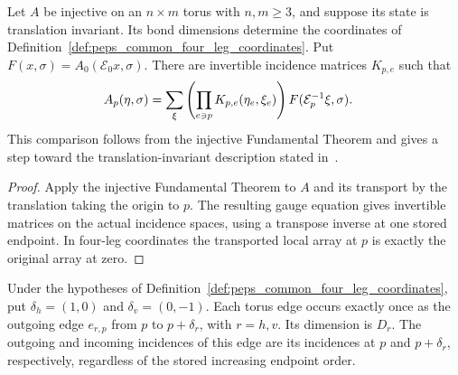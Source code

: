 \begin{lemma}%
    \label{thm:peps_common_local_translation_orbit}
    \leanok
    Let $A$ be injective on an $n\times m$ torus with $n,m\ge3$, and
    suppose its state is translation invariant. Its bond dimensions determine
    the coordinates of Definition~\ref{def:peps_common_four_leg_coordinates}.
    Put $F(x,\sigma)=A_0(\mathcal E_0x,\sigma)$.
    There are invertible incidence matrices $K_{p,e}$ such that
    \begin{align}
        A_p(\eta,\sigma)
         & =\sum_\xi\left(\prod_{e\ni p}K_{p,e}(\eta_e,\xi_e)\right)
        F(\mathcal E_p^{-1}\xi,\sigma).\notag
    \end{align}
    This comparison follows from the injective Fundamental Theorem and
    gives a step toward the translation-invariant description stated
    in~\cite[lines~1891--1894]{Molnar2018NormalPEPS}.
\end{lemma}
\begin{proof}\leanok
    Apply the injective Fundamental Theorem to $A$ and its transport by the
    translation taking the origin to $p$. The resulting gauge equation gives
    invertible matrices on the actual incidence spaces, using a transpose
    inverse at one stored endpoint. In four-leg coordinates the transported
    local array at $p$ is exactly the original array at zero.
\end{proof}

\begin{definition}%
    \label{def:peps_native_outgoing_edges}
    \leanok
    Under the hypotheses of
    Definition~\ref{def:peps_common_four_leg_coordinates}, put
    $\delta_h=(1,0)$ and $\delta_v=(0,-1)$. Each torus edge occurs
    exactly once as the outgoing edge $e_{r,p}$ from $p$ to $p+\delta_r$,
    with $r=h,v$. Its dimension is $D_r$. The outgoing and incoming
    incidences of this edge are its incidences at $p$ and $p+\delta_r$,
    respectively, regardless of the stored increasing endpoint order.
\end{definition}

